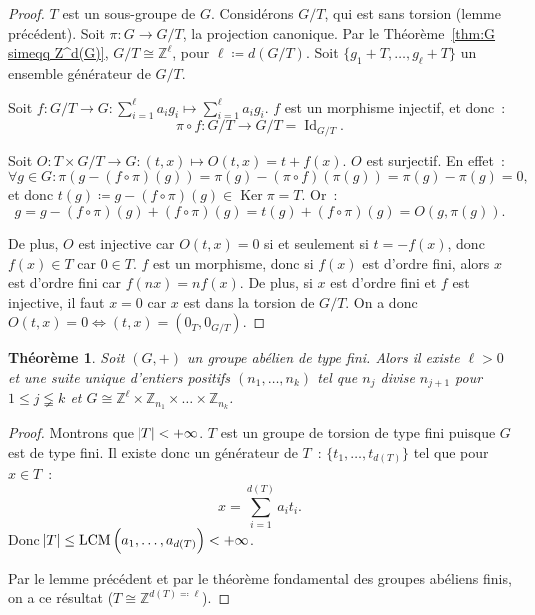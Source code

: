 \documentclass{article}
\newtheorem{thm}{Théorème}[section]
\theoremstyle{definition}
\theoremstyle{remark}
\DeclareMathOperator{\Id}{Id}
\DeclareMathOperator{\Ker}{Ker}
\DeclareMathOperator{\LCM}{LCM}
\newcommand{\Z}{\mathbb Z}
\newcommand{\simeqq}{\cong}
\begin{document}
		\begin{proof} $T$ est un sous-groupe de $G$. Considérons $G/T$, qui est sans torsion (lemme précédent). Soit $\pi : G \to G/T$, la projection canonique.
		Par le Théorème~\ref{thm:G simeqq Z^d(G)}, $G/T \simeqq \Z^\ell$, pour $\ell \coloneqq d(G/T)$. Soit $\{g_1+T, \ldots, g_\ell+T\}$ un ensemble
		générateur de $G/T$.

		Soit $f : G/T \to G : \sum_{i=1}^\ell a_ig_i \mapsto \sum_{i=1}^\ell a_ig_i$. $f$ est un morphisme injectif, et donc~:
		\[\pi \circ f : G/T \to G/T = \Id_{G/T}.\]

		Soit $O : T \times G/T \to G : (t, x) \mapsto O(t, x) = t+f(x)$. $O$ est surjectif. En effet~:
		\[\forall g \in G : \pi(g-(f \circ \pi)(g)) = \pi(g) - (\pi \circ f)(\pi(g)) = \pi(g) - \pi(g) = 0,\]
		et donc $t(g) \coloneqq g - (f \circ \pi)(g) \in \Ker \pi = T$. Or~:
		\[g = g - (f \circ \pi)(g) + (f \circ \pi)(g) = t(g) + (f \circ \pi)(g) = O(g, \pi(g)).\]

		De plus, $O$ est injective car $O(t, x) = 0$ si et seulement si $t = -f(x)$, donc $f(x) \in T$ car $0 \in T$. $f$ est un morphisme, donc si $f(x)$ est
		d'ordre fini, alors $x$ est d'ordre fini car $f(nx) = nf(x)$. De plus, si $x$ est d'ordre fini et $f$ est injective, il faut $x=0$ car $x$ est dans
		la torsion de $G/T$. On a donc $O(t, x) = 0 \iff (t, x) = (0_T, 0_{G/T})$.
		\end{proof}

		\begin{thm} Soit $(G, +)$ un groupe abélien de type fini. Alors il existe $\ell > 0$ et une suite unique d'entiers positifs $(n_1, \ldots, n_k)$
		tel que $n_j$ divise $n_{j+1}$ pour $1  \leq j \lneqq k$ et $G \simeqq \Z^\ell \times \Z_{n_1} \times \ldots \times \Z_{n_k}$.
		\end{thm}

		\begin{proof} Montrons que $\abs T < +\infty$. $T$ est un groupe de torsion de type fini puisque $G$ est de type fini.
		Il existe donc un générateur de $T$~: $\{t_1, \ldots, t_{d(T)}\}$ tel que pour $x \in T$~:
		\[x = \sum_{i=1}^{d(T)}a_it_i.\]
		Donc $\abs T \leq \LCM\left(a_1, \ldots, a_{d(T)}\right) < +\infty$.

		Par le lemme précédent et par le théorème fondamental des groupes abéliens finis, on a ce résultat ($T \simeqq \Z^{d(T) \eqqcolon \ell}$).
		\end{proof}
\end{document}

